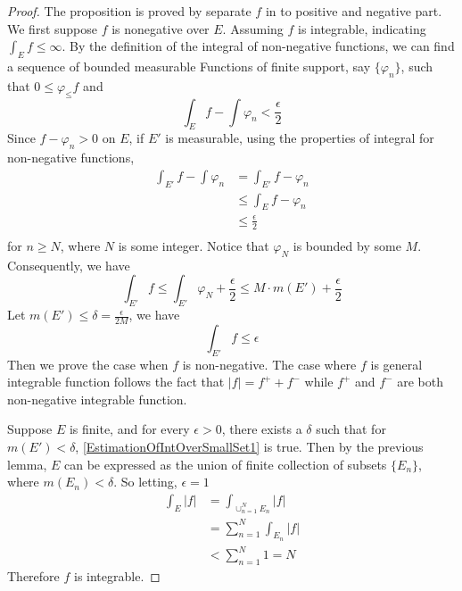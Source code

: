 \documentclass[lang=en, 12pt]{elegantbook}
\begin{document}
        \begin{proof}
            The proposition is proved by separate $f$ in to positive
        and negative part. We first suppose $f$ is nonegative over
        $E$. Assuming $f$ is integrable, indicating $\int_E f \leq
        \infty$. By the definition of the integral of non-negative 
        functions, we can find a sequence of bounded measurable Functions
        of finite support, say $\{\varphi_n\}$, such that
        $0 \leq \varphi_ \leq f$ and 
        \begin{equation*}
            \int_E f - \int \varphi_n < \frac{\epsilon}{2}
        \end{equation*}
            Since $f -\varphi_n>0$ on $E$, if $E'$ is measurable,
        using the properties of integral for non-negative functions,
        \begin{equation*}
            \begin{aligned}
                \int_{E'} f - \int \varphi_n &= \int_{E'} f -\varphi_n\\
            &\leq \int_{E} f -\varphi_n\\
            &\leq \frac{\epsilon}{2}\\
            \end{aligned}
        \end{equation*}
        for $n \geq N$, where $N$ is some integer. Notice that $\varphi_N$ is
        bounded by some $M$. Consequently, we have
            \begin{equation*}
                \int_{E'} f \leq \int_{E'} \varphi_N + \frac{\epsilon}{2} 
                \leq M\cdot m(E') +\frac{\epsilon}{2}
            \end{equation*}
            Let $m(E')\leq \delta = \frac{\epsilon}{2M}$, we have 
            $$\int_{E'} f \leq \epsilon$$
            Then we prove the case when $f$ is non-negative. The case 
        where $f$ is general integrable function follows the fact that $|f| = f^+ +f^-$
        while $f^+$ and $f^-$ are both non-negative integrable function.\par
            Suppose $E$ is finite, and for every $\epsilon >0$, there exists a 
            $\delta$ such that for $m(E')< \delta$, 
            \eqref{EstimationOfIntOverSmallSet1} is true.
            Then by the previous lemma, $E$ can be expressed as the union of finite
        collection of subsets $\{E_n\}$, where $m(E_n)<\delta$.
            So letting, $\epsilon =1$
            \begin{equation*}
                \begin{aligned}
                    \int_E |f| &= \int_{\cup_{n=1}^{N} E_n} |f|\\ 
                    &= \sum_{n=1}^{N} \int_{E_n} |f| \\
                    &< \sum_{n=1}^{N} 1 = N
                \end{aligned}
            \end{equation*}
            Therefore $f$ is integrable. 
        \end{proof}
\end{document}
